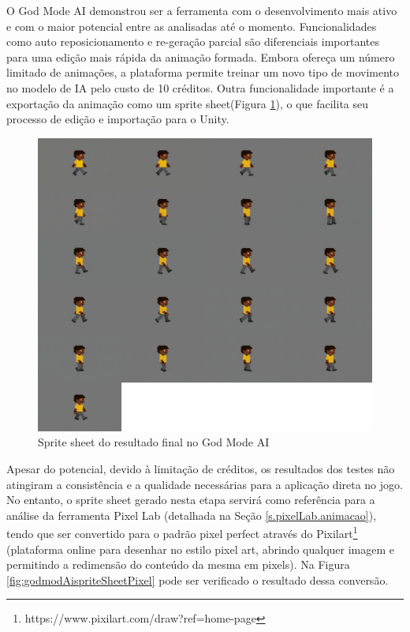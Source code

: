 O God Mode AI demonstrou ser a ferramenta com o desenvolvimento mais ativo e com o maior potencial entre as analisadas até o momento. Funcionalidades como auto reposicionamento e re-geração parcial são diferenciais importantes para uma edição mais rápida da animação formada. Embora ofereça um número limitado de animações, a plataforma permite treinar um novo tipo de movimento no modelo de IA pelo custo de 10 créditos. Outra funcionalidade importante é a exportação da animação como um sprite sheet(Figura \ref{fig:godmodAispriteSheet}), o que facilita seu processo de edição e importação para o Unity. %

\begin{figure}[htbp]
    \centering
    \caption{\small Sprite sheet do resultado final no God Mode AI}
    \label{fig:godmodAispriteSheet}
    \includegraphics[width=1\linewidth]{figs/godmodAI/sprite sheet.png}
\end{figure}

Apesar do potencial, devido à limitação de créditos, os resultados dos testes não atingiram a consistência e a qualidade necessárias para a aplicação direta no jogo. No entanto, o sprite sheet gerado nesta etapa servirá como referência para a análise da ferramenta Pixel Lab (detalhada na Seção \ref{s.pixelLab.animacao}), tendo que ser convertido para o padrão pixel perfect através do Pixilart\footnote{https://www.pixilart.com/draw?ref=home-page} (plataforma online para desenhar no estilo pixel art, abrindo qualquer imagem e permitindo a redimensão do conteúdo da mesma em pixels). Na Figura \ref{fig:godmodAispriteSheetPixel} pode ser verificado o resultado dessa conversão.

